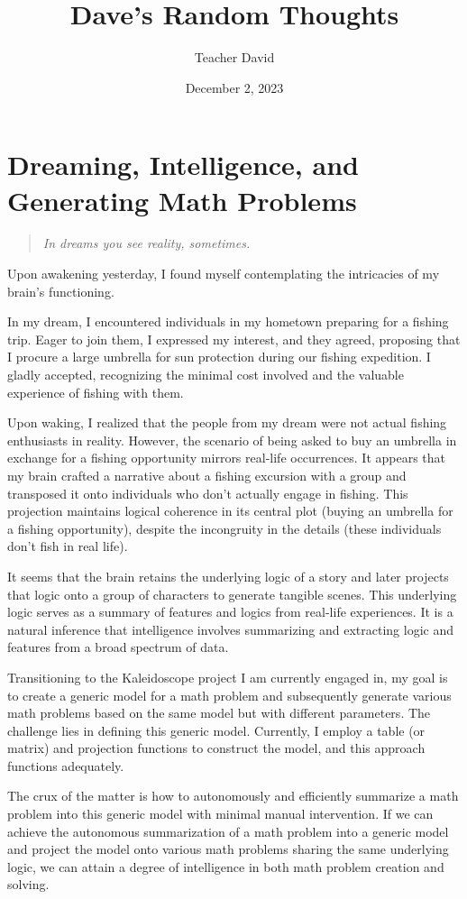 \documentclass[11pt, oneside]{book}   	%
\title{Dave's Random Thoughts}
\author{Teacher David}
\date{December 2, 2023}							%
\begin{document}
\maketitle

\chapter{Dreaming, Intelligence, and Generating Math Problems}
\begin{quotation}
  \emph{In dreams you see reality, sometimes.}
\end{quotation}

Upon awakening yesterday, I found myself contemplating the intricacies
of my brain's functioning. 

In my dream, I encountered individuals in my hometown preparing for a
fishing trip. Eager to join them, I expressed my interest, and they
agreed, proposing that I procure a large umbrella for sun protection
during our fishing expedition. I gladly accepted, recognizing the
minimal cost involved and the valuable experience of fishing with
them. 

Upon waking, I realized that the people from my dream were not actual
fishing enthusiasts in reality. However, the scenario of being asked
to buy an umbrella in exchange for a fishing opportunity mirrors
real-life occurrences. It appears that my brain crafted a narrative
about a fishing excursion with a group and transposed it onto
individuals who don't actually engage in fishing. This projection
maintains logical coherence in its central plot (buying an umbrella
for a fishing opportunity), despite the incongruity in the details
(these individuals don't fish in real life). 

It seems that the brain retains the underlying logic of a story and
later projects that logic onto a group of characters to generate
tangible scenes. This underlying logic serves as a summary of features
and logics from real-life experiences. It is a natural inference that
intelligence involves summarizing and extracting logic and features
from a broad spectrum of data. 

Transitioning to the Kaleidoscope project I am currently engaged in,
my goal is to create a generic model for a math problem and
subsequently generate various math problems based on the same model
but with different parameters. The challenge lies in defining this
generic model. Currently, I employ a table (or matrix) and projection
functions to construct the model, and this approach functions
adequately. 

The crux of the matter is how to autonomously and efficiently
summarize a math problem into this generic model with minimal manual
intervention. If we can achieve the autonomous summarization of a math
problem into a generic model and project the model onto various math
problems sharing the same underlying logic, we can attain a degree of
intelligence in both math problem creation and solving.
\end{document}
